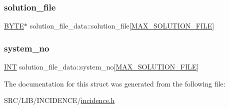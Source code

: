 \mbox{\label{structsolution__file__data_a82f0ae0a469889fb85a8526613585ef8}} 
\subsubsection{\texorpdfstring{solution\+\_\+file}{solution\_file}}
{\footnotesize\ttfamily \mbox{\hyperlink{galois_8h_ab6cc7b4aeb6ea31aba2b3fbfc83ff5e6}{B\+Y\+TE}}$\ast$ solution\+\_\+file\+\_\+data\+::solution\+\_\+file\mbox{[}\mbox{\hyperlink{incidence_8h_a079de7c96ad5c6ac9d5b822a943460f7}{M\+A\+X\+\_\+\+S\+O\+L\+U\+T\+I\+O\+N\+\_\+\+F\+I\+LE}}\mbox{]}}

\mbox{\label{structsolution__file__data_a2a87003e4de87213c91d4921ad3277c0}} 
\subsubsection{\texorpdfstring{system\+\_\+no}{system\_no}}
{\footnotesize\ttfamily \mbox{\hyperlink{galois_8h_a09fddde158a3a20bd2dcadb609de11dc}{I\+NT}} solution\+\_\+file\+\_\+data\+::system\+\_\+no\mbox{[}\mbox{\hyperlink{incidence_8h_a079de7c96ad5c6ac9d5b822a943460f7}{M\+A\+X\+\_\+\+S\+O\+L\+U\+T\+I\+O\+N\+\_\+\+F\+I\+LE}}\mbox{]}}



The documentation for this struct was generated from the following file\+:\begin{DoxyCompactItemize}
\item 
S\+R\+C/\+L\+I\+B/\+I\+N\+C\+I\+D\+E\+N\+C\+E/\mbox{\hyperlink{incidence_8h}{incidence.\+h}}\end{DoxyCompactItemize}
